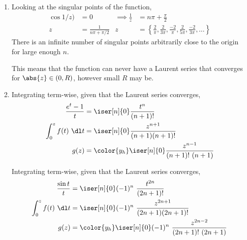 \begin{enumerate}
\begin{enumerate}
              \item Looking at the singular points of the function,
                    \begin{align}
                        \cos1/z)             & = 0                      &
                        \implies \frac{1}{z} & = n\pi + \frac{\pi}{2}     \\
                        z                    & = \frac{1}{n\pi + \pi/2} &
                        z                    & = \left\{ \frac{2}{\pi},
                        \frac{2}{3\pi}, \frac{-2}{\pi}, \frac{2}{5\pi},
                        \frac{-2}{3\pi}, \dots \right\}
                    \end{align}
                    There is an infinite number of singular points arbitrarily close to
                    the origin for large enough $ n $. \par
                    This means that the function \textcolor{y_p}{can never have a Laurent
                        series that converges} for
                    $ \abs{z} \in (0, R) $, however small $ R $ may be.

              \item Integrating term-wise, given that the Laurent series converges,
                    \begin{align}
                        \frac{e^t - 1}{t} & = \iser[n]{0} \frac{t^n}{(n+1)!}         \\
                        \int_{0}^{z} f(t)\ \dl t
                                          & = \iser[n]{0} \frac{z^{n+1}}
                        {(n+1) (n+1)!}                                               \\
                        g(z)              & = \color{y_h} \iser[n]{0} \frac{z^{n-1}}
                        {(n+1)!\ (n+1)}
                    \end{align}

                    Integrating term-wise, given that the Laurent series converges,
                    \begin{align}
                        \frac{\sin t}{t} & = \iser[n]{0} (-1)^n
                        \ \frac{t^{2n}}{(2n+1)!}                                 \\
                        \int_{0}^{z} f(t)\ \dl t
                                         & = \iser[n]{0} (-1)^n\ \frac{z^{2n+1}}
                        {(2n+1) (2n+1)!}                                         \\
                        g(z)             & = \color{y_h} \iser[n]{0} (-1)^n
                        \ \frac{z^{2n-2}} {(2n+1)!\ (2n+1)}
                    \end{align}
          \end{enumerate}


\end{enumerate}
